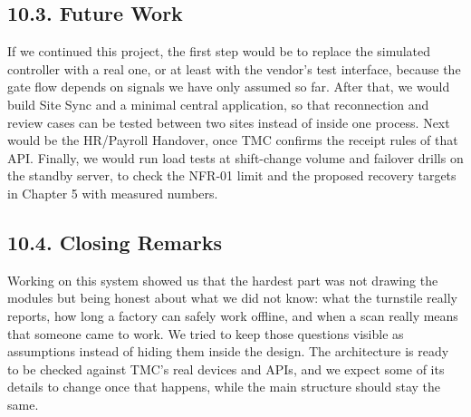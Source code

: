 \subsection*{10.3. Future Work}

{}

If we continued this project, the first step would be to replace the simulated controller with a real one, or at least with the vendor's test interface, because the gate flow depends on signals we have only assumed so far. After that, we would build Site Sync and a minimal central application, so that reconnection and review cases can be tested between two sites instead of inside one process. Next would be the HR/Payroll Handover, once TMC confirms the receipt rules of that API. Finally, we would run load tests at shift-change volume and failover drills on the standby server, to check the NFR-01 limit and the proposed recovery targets in Chapter 5 with measured numbers.

\subsection*{10.4. Closing Remarks}

{}

Working on this system showed us that the hardest part was not drawing the modules but being honest about what we did not know: what the turnstile really reports, how long a factory can safely work offline, and when a scan really means that someone came to work. We tried to keep those questions visible as assumptions instead of hiding them inside the design. The architecture is ready to be checked against TMC's real devices and APIs, and we expect some of its details to change once that happens, while the main structure should stay the same.
